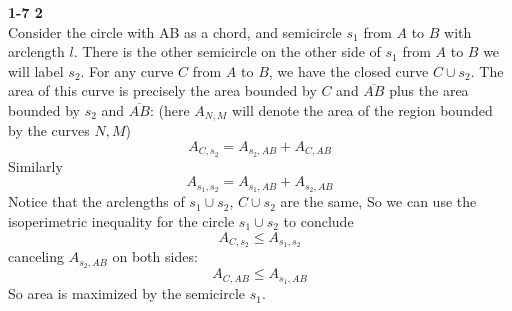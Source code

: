 \documentclass[12pt]{article}
\newenvironment{ques}[1]{\textbf{#1}\vspace{1 mm}\\ }{\bigskip}
\theoremstyle{definition}
\begin{document}
\begin{ques}{1-7 2}
	Consider the circle with AB as a chord, and semicircle $s_1$ from $A$ to $B$
	with arclength $l$. There is the other semicircle on the other side of
	$s_1$ from $A$ to $B$ we will label $s_2$. For any curve $C$ from $A$ to
	$B$, we have the closed curve $C \cup s_2$. The area of this curve is
	precisely the area bounded by $C$ and $\overline{AB}$ plus the area bounded
	by $s_2$ and $\overline{AB}$: (here $A_{N,M}$ will denote the area of the
	region bounded by the curves $N,M$)
	$$A_{C,s_2} = A_{s_2,AB} + A_{C,AB}$$
	Similarly 
	$$A_{s_1,s_2} = A_{s_1,AB} + A_{s_2,AB}$$
	Notice that the arclengths of $s_1 \cup s_2$, $C \cup s_2$ are the same, So
	we can use the isoperimetric inequality for the circle $s_1 \cup s_2$ to
	conclude
	$$A_{C,s_2} \leq A_{s_1,s_2}$$
	canceling $A_{s_2,AB}$ on both sides:
	$$A_{C,AB} \leq A_{s_1,AB}$$
	So area is maximized by the semicircle $s_1$.

\end{ques}
\end{document}
